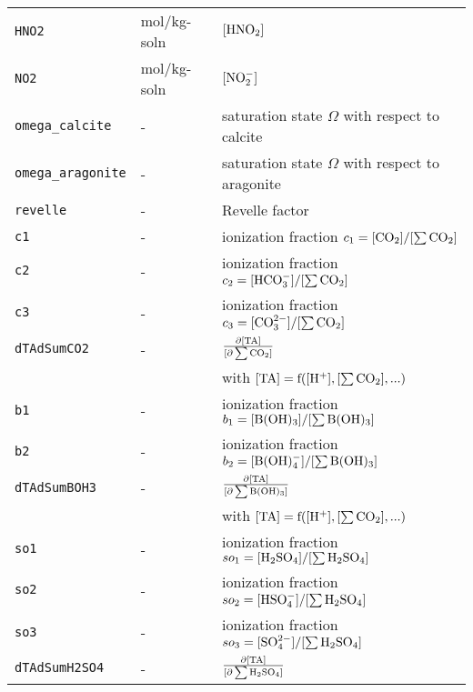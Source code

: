 \documentclass[article,nojss]{jss}
\begin{document}
\begin{footnotesize}
\begin{longtable}{l|l|p{7cm}}
\texttt{HNO2}        & mol/kg-soln                     & $[\rm HNO_2]$\\                     
\texttt{NO2}         & mol/kg-soln                     & $[\rm NO_2^-]$\\         
\texttt{omega\_calcite}   & -                          & saturation state $\Omega$ with respect to calcite\\
\texttt{omega\_aragonite} & -                          & saturation state $\Omega$ with respect to aragonite\\
\texttt{revelle}     & -                               & Revelle factor\\    
\texttt{c1}          & -                               & ionization fraction $c_1 = [\rm CO_2]/[\rm \sum CO_2]$\\
\texttt{c2}          & -                               & ionization fraction $c_2 = [\rm HCO_3^-]/[\rm \sum CO_2]$\\
\texttt{c3}          & -                               & ionization fraction $c_3 = [\rm CO_3^{2-}]/[\rm \sum CO_2]$\\
\texttt{dTAdSumCO2}  & -                               & $\rm \frac{\partial [TA]}{[\partial \sum CO_2]}$\\
            &                                 & with $\rm[TA] = f([H^+], [\sum CO_2], ...)$\\
\texttt{b1}          & -                               & ionization fraction $b_1 = [\rm B(OH)_3]/[\rm \sum B(OH)_3]$\\               
\texttt{b2}          & -                               & ionization fraction $b_2 = [\rm B(OH)_4^-]/[\rm \sum B(OH)_3]$\\               
\texttt{dTAdSumBOH3} & -                               & $\rm \frac{\partial [TA]}{[\partial \sum B(OH)_3]}$\\
            &                                 & with $\rm [TA] = f([H^+], [\sum CO_2], ...)$\\
\texttt{so1}         & -                               & ionization fraction $so_1 = [\rm H_2SO_4]/[\rm \sum H_2SO_4]$\\               
\texttt{so2}         & -                               & ionization fraction $so_2 = [\rm HSO_4^-]/[\rm \sum H_2SO_4]$\\               
\texttt{so3}         & -                               & ionization fraction $so_3 = [\rm SO_4^{2-}]/[\rm \sum H_2SO_4]$\\               
\texttt{dTAdSumH2SO4}& -                               & $\rm \frac{\partial [TA]}{[\partial \sum H_2SO_4]}$\\

\end{longtable}
\end{footnotesize}
\end{document}
